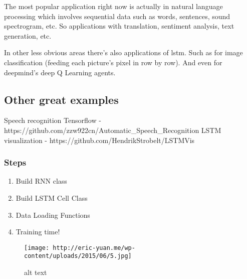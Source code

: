 \documentclass[11pt]{article}
\makeatletter
\def\maxwidth{\ifdim\Gin@nat@width>\linewidth\linewidth
    \else\Gin@nat@width\fi}
\let\Oldincludegraphics\includegraphics
\renewcommand{\includegraphics}[1]{\Oldincludegraphics[width=.8\maxwidth]{#1}}
\providecommand{\tightlist}{%
      \setlength{\itemsep}{0pt}\setlength{\parskip}{0pt}}
\makeatother
\begin{document}
The most popular application right now is actually in natural language
processing which involves sequential data such as words, sentences,
sound spectrogram, etc. So applications with translation, sentiment
analysis, text generation, etc.

In other less obvious areas there's also applications of lstm. Such as
for image classification (feeding each picture's pixel in row by row).
And even for deepmind's deep Q Learning agents.

\hypertarget{other-great-examples}{%
\subsection{Other great examples}\label{other-great-examples}}

Speech recognition Tensorflow -
https://github.com/zzw922cn/Automatic\_Speech\_Recognition LSTM
visualization - https://github.com/HendrikStrobelt/LSTMVis

    \hypertarget{steps}{%
\subsubsection{Steps}\label{steps}}

\begin{enumerate}
\def\labelenumi{\arabic{enumi}.}
\tightlist
\item
  Build RNN class
\item
  Build LSTM Cell Class
\item
  Data Loading Functions
\item
  Training time!
\end{enumerate}

\begin{figure}
\centering
\texttt{[image: http://eric-yuan.me/wp-content/uploads/2015/06/5.jpg]}
\caption{alt text}
\end{figure}
\end{document}
